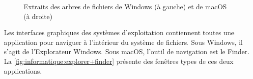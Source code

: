 \begin{figure}
  \begin{minipage}[t]{0.45\linewidth}
  \end{minipage}
  \hfill
  \begin{minipage}[t]{0.45\linewidth}
  \end{minipage}
  \caption[Extraits de la hiérarchie des systèmes de fichiers]{%
    Extraits des arbres de fichiers de Windows (à gauche) et de
    macOS (à droite)}
  \label{fig:informatique:fs}
\end{figure}

Les interfaces graphiques des systèmes d'exploitation contiennent
toutes une application pour naviguer à l'intérieur du système de
fichiers. Sous Windows, il s'agit de %
l'Explorateur Windows. Sous
macOS, l'outil de navigation est le Finder.
La \autoref{fig:informatique:explorer+finder} présente des fenêtres
types de ces deux applications.

